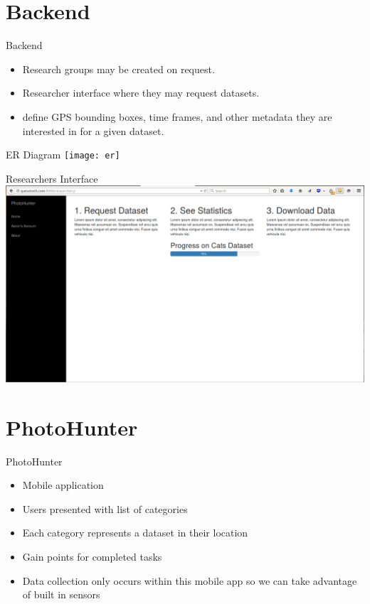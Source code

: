 \documentclass[aspectratio=169]{beamer}
\begin{document}
\section{Backend}

\begin{frame}{Backend}
  \begin{itemize}
    \item Research groups may be created on request. 

    \item Researcher interface where they may request datasets. 

    \item define GPS bounding boxes, time frames, and other metadata they are 
      interested in for a given dataset.
  \end{itemize}
\end{frame}

\begin{frame}{ER Diagram}
  \centering
  \texttt{[image: er]}
\end{frame}

\begin{frame}{Researchers Interface}
  \centering
  \includegraphics[width=\textwidth,height=\textheight,keepaspectratio]{researchers}
\end{frame}

\section{PhotoHunter}

\begin{frame}{PhotoHunter}
  \begin{itemize}
    
    \item Mobile application

    \item Users presented with list of categories

    \item Each category represents a dataset in their location

    \item Gain points for completed tasks

    \item Data collection only occurs within this mobile app so
          we can take advantage of built in sensors

  \end{itemize}
\end{frame}
\end{document}
